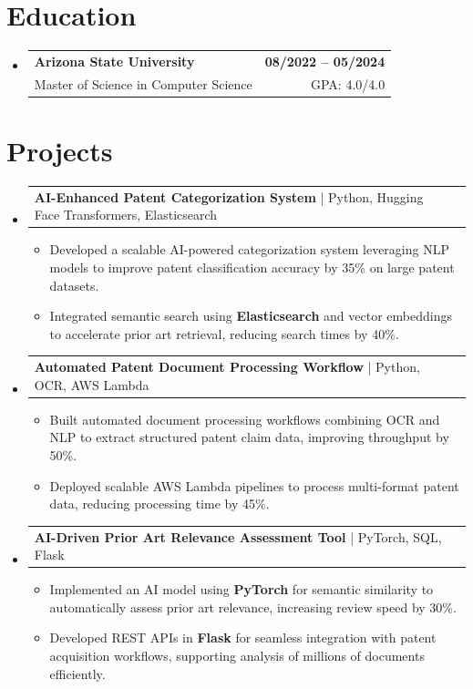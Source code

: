\documentclass[letterpaper,11pt]{article}
\makeatletter
\newcommand{\resumeItem}[1]{
  \item\footnotesize{
    {#1 \vspace{-2pt}}
  }
}
\newcommand{\educationSubheading}[4]{
  \vspace{-2pt}\item
    \begin{tabular*}{1.0\textwidth}[t]{l@{\extracolsep{\fill}}r}
      \textbf{\small #1} & \textbf{\small #2} \\
      {\small#3} & {\small #4} \\
    \end{tabular*}\vspace{-7pt}
}
\newcommand{\resumeProjectHeading}[2]{
    \item
    \begin{tabular*}{1.001\textwidth}{l@{\extracolsep{\fill}}r}
      \small#1 & \textbf{\small #2}\\
    \end{tabular*}\vspace{-7pt}
}
\newcommand{\resumeSubHeadingListStart}{\begin{itemize}[leftmargin=0pt, label={}]}
\newcommand{\resumeSubHeadingListEnd}{\end{itemize}}
\newcommand{\resumeItemListStart}{\begin{itemize}[leftmargin=*]}
\newcommand{\resumeItemListEnd}{\end{itemize}\vspace{-5pt}}
\makeatother
\begin{document}
\section{Education}
  \resumeSubHeadingListStart
    \educationSubheading
      {Arizona State University}{08/2022 -- 05/2024}
      {Master of Science in Computer Science}{GPA: 4.0/4.0}
  \resumeSubHeadingListEnd

\section{Projects}
    \vspace{-5pt}
    \resumeSubHeadingListStart
          \resumeProjectHeading
              {\textbf{AI-Enhanced Patent Categorization System} | Python, Hugging Face Transformers, Elasticsearch}{}
        \resumeItemListStart
            \resumeItem{Developed a scalable AI-powered categorization system leveraging NLP models to improve patent classification accuracy by 35\% on large patent datasets.}
            \resumeItem{Integrated semantic search using \textbf{Elasticsearch} and vector embeddings to accelerate prior art retrieval, reducing search times by 40\%.}
        \resumeItemListEnd
        \vspace{-12pt}
    
    \resumeProjectHeading
        {\textbf{Automated Patent Document Processing Workflow} | Python, OCR, AWS Lambda}{}
        \resumeItemListStart
            \resumeItem{Built automated document processing workflows combining OCR and NLP to extract structured patent claim data, improving throughput by 50\%.}
            \resumeItem{Deployed scalable AWS Lambda pipelines to process multi-format patent data, reducing processing time by 45\%.}
        \resumeItemListEnd
          \vspace{-12pt}
      \resumeProjectHeading
          {\textbf{AI-Driven Prior Art Relevance Assessment Tool} | PyTorch, SQL, Flask}{}
          \resumeItemListStart
              \resumeItem{Implemented an AI model using \textbf{PyTorch} for semantic similarity to automatically assess prior art relevance, increasing review speed by 30\%.}
              \resumeItem{Developed REST APIs in \textbf{Flask} for seamless integration with patent acquisition workflows, supporting analysis of millions of documents efficiently.}
          \resumeItemListEnd 
    \resumeSubHeadingListEnd
\end{document}
